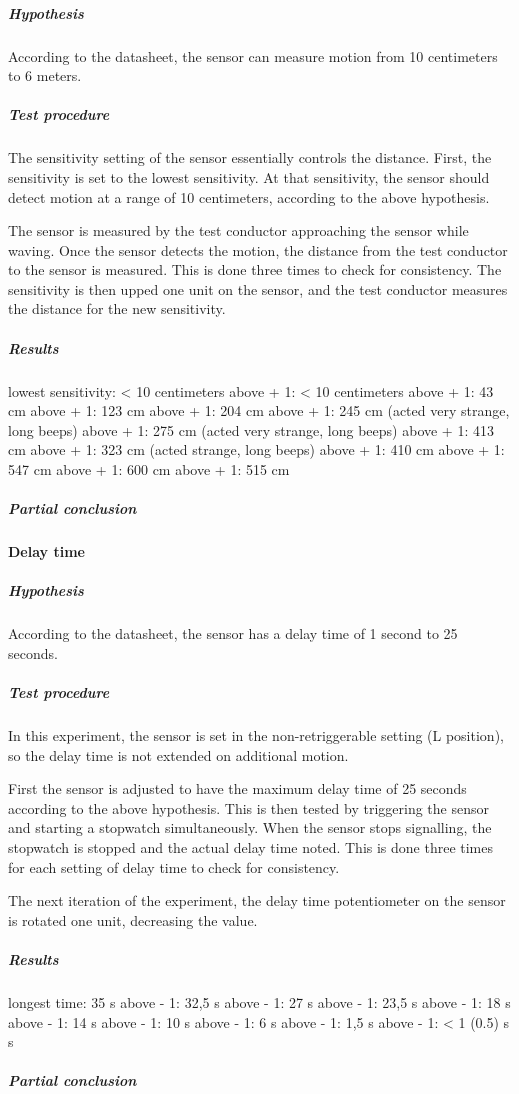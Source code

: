 \subparagraph{Hypothesis}

According to the datasheet, the sensor can measure motion from 10 centimeters to
6 meters.

\subparagraph{Test procedure}

The sensitivity setting of the sensor essentially controls the distance. First,
the sensitivity is set to the lowest sensitivity. At that sensitivity, the
sensor should detect motion at a range of 10 centimeters, according to the above
hypothesis.

The sensor is measured by the test conductor approaching the sensor while
waving. Once the sensor detects the motion, the distance from the test conductor
to the sensor is measured. This is done three times to check for consistency. The sensitivity is then upped one unit on the sensor,
and the test conductor measures the distance for the new sensitivity.

\subparagraph{Results}

lowest sensitivity: < 10 centimeters
above + 1: < 10 centimeters
above + 1: 43 cm
above + 1: 123 cm
above + 1: 204 cm
above + 1: 245 cm (acted very strange, long beeps)
above + 1: 275 cm (acted very strange, long beeps)
above + 1: 413 cm
above + 1: 323 cm (acted strange, long beeps)
above + 1: 410 cm
above + 1: 547 cm
above + 1: 600 cm
above + 1: 515 cm


\subparagraph{Partial conclusion}


\paragraph{Delay time}

\subparagraph{Hypothesis}

According to the datasheet, the sensor has a delay time of 1 second to 25 seconds.

\subparagraph{Test procedure}

In this experiment, the sensor is set in the non-retriggerable setting (L
position), so the delay time is not extended on additional motion.

First the sensor is adjusted to have the maximum delay time of 25 seconds
according to the above hypothesis. This is then tested by triggering the sensor
and starting a stopwatch simultaneously. When the sensor stops signalling, the
stopwatch is stopped and the actual delay time noted. This is done three times
for each setting of delay time to check for consistency.

The next iteration of the experiment, the delay time potentiometer on the sensor
is rotated one unit, decreasing the value.

\subparagraph{Results}

longest time: 35 s
above - 1: 32,5 s
above - 1: 27 s
above - 1: 23,5 s
above - 1: 18 s
above - 1: 14 s
above - 1: 10 s
above - 1: 6 s
above - 1: 1,5 s
above - 1: < 1 (0.5) s s

\subparagraph{Partial conclusion}

